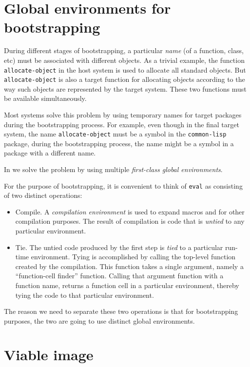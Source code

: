 \section{Global environments for bootstrapping}

During different stages of bootstrapping, a particular \emph{name} (of
a function, class, etc) must be associated with different objects.  As
a trivial example, the function \texttt{allocate-object} in the host
system is used to allocate all standard objects.  But
\texttt{allocate-object} is also a target function for allocating
objects according to the way such objects are represented by the
target system.  These two functions must be available simultaneously.

Most systems solve this problem by using temporary names for target
packages during the bootstrapping process.  For example, even though
in the final target system, the name \texttt{allocate-object} must be
a symbol in the \texttt{common-lisp} package, during the bootstrapping
process, the name might be a symbol in a package with a different
name.

In \sysname{} we solve the problem by using multiple \emph{first-class
  global environments}.

For the purpose of bootstrapping, it is convenient to think of
\texttt{eval} as consisting of two distinct operations:

\begin{itemize}
\item Compile.  A \emph{compilation environment} is used to expand
  macros and for other compilation purposes.  The result of
  compilation is code that is \emph{untied} to any particular
  environment.
\item Tie.  The untied code produced by the first step is \emph{tied}
  to a particular run-time environment.  Tying is accomplished by
  calling the top-level function created by the compilation.  This
  function takes a single argument, namely a ``function-cell finder''
  function.  Calling that argument function with a function name,
  returns a function cell in a particular environment, thereby tying
  the code to that particular environment.
\end{itemize}

The reason we need to separate these two operations is that for
bootstrapping purposes, the two are going to use distinct global
environments.

\section{Viable image}
\label{sec-bootstrapping-viable-image}

